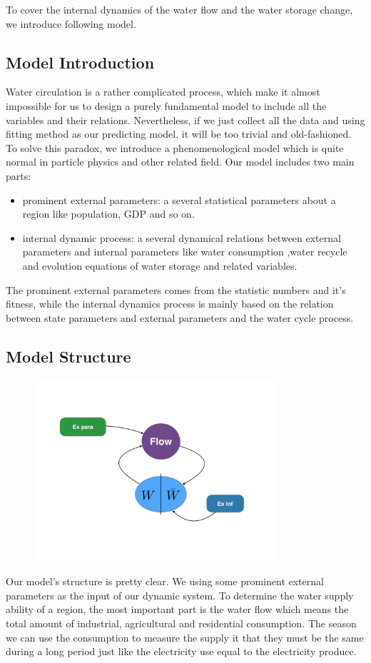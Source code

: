 To cover the internal dynamics of the water flow and the water storage change, we introduce following model.

  \subsection{Model Introduction}
    Water circulation is a rather complicated process, which make it almost impossible for us to design a purely fundamental model to include all the variables and their relations. Nevertheless, if we just collect all the data and using fitting method as our predicting model, it will be too trivial and old-fashioned. To solve this paradox, we introduce a phenomenological model which is quite normal in particle physics and other related field. Our model includes two main parts:
    \begin{itemize}
      \item prominent external parameters: a several statistical parameters about a region like population, GDP and so on.
      \item internal dynamic process: a several dynamical relations between external parameters and internal parameters like water consumption ,water recycle and evolution equations of water storage and related variables.
    \end{itemize}
    The prominent external parameters comes from the statistic numbers and it's fitness, while the internal dynamics process is mainly based on the relation between state parameters and external parameters and the water cycle process.

  \subsection{Model Structure}


    \begin{figure}
    \includegraphics[width = 9cm]{picture/struc.jpg}
    \end{figure}
    Our model's structure is pretty clear.
    We using some prominent external parameters as the input of our dynamic system. To determine the water supply ability of a region, the most important part is the water flow which means the total amount of industrial, agricultural and residential consumption. The season we can use the consumption to measure the supply it that they must be the same during a long period just like the electricity use equal to the electricity produce.

